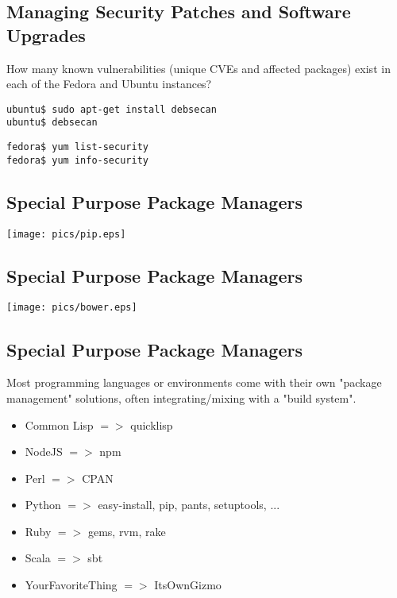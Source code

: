 \documentclass[xga]{xdvislides}
\begin{document}
\subsection{Managing Security Patches and Software Upgrades}
How many known vulnerabilities (unique CVEs and affected packages) exist
in each of the Fedora and Ubuntu instances?

\begin{verbatim}
ubuntu$ sudo apt-get install debsecan
ubuntu$ debsecan
\end{verbatim}

\begin{verbatim}
fedora$ yum list-security
fedora$ yum info-security
\end{verbatim}

\subsection{Special Purpose Package Managers}
\vfill
\begin{center}
	\texttt{[image: pics/pip.eps]}
\end{center}
\vfill

\subsection{Special Purpose Package Managers}
\vfill
\begin{center}
	\texttt{[image: pics/bower.eps]}
\end{center}
\vfill


\subsection{Special Purpose Package Managers}
Most programming languages or environments come with their own "package
management" solutions, often integrating/mixing with a "build system".
\begin{itemize}
	\item Common Lisp $=>$ quicklisp
	\item NodeJS $=>$ npm
	\item Perl $=>$ CPAN
	\item Python $=>$ easy-install, pip, pants, setuptools, ...
	\item Ruby $=>$ gems, rvm, rake
	\item Scala $=>$ sbt
	\item YourFavoriteThing $=>$ ItsOwnGizmo
\end{itemize}
\end{document}
